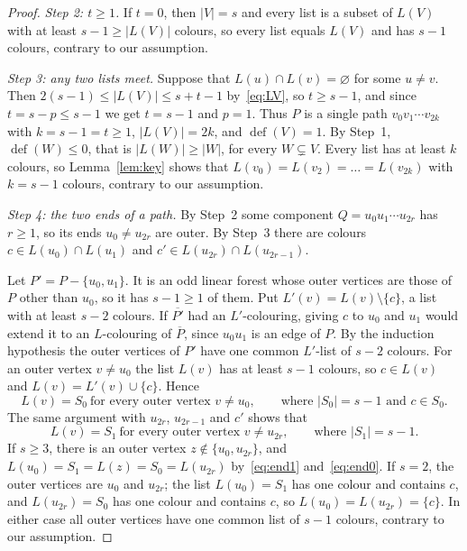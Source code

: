 \documentclass[11pt,a4paper,reqno]{amsart}
\theoremstyle{definition}
\theoremstyle{remark}
\newcommand{\df}{\operatorname{def}}
\begin{document}
\begin{proof}
\smallskip\noindent\emph{Step 2: $t\ge1$.} If $t=0$, then $|V|=s$ and every list is a subset of $L(V)$ with at least $s-1\ge|L(V)|$ colours, so every list equals $L(V)$ and has $s-1$ colours, contrary to our assumption.

\smallskip\noindent\emph{Step 3: any two lists meet.} Suppose that $L(u)\cap L(v)=\varnothing$ for some $u\ne v$. Then $2(s-1)\le|L(V)|\le s+t-1$ by~\eqref{eq:LV}, so $t\ge s-1$, and since $t=s-p\le s-1$ we get $t=s-1$ and $p=1$. Thus $P$ is a single path $v_0v_1\cdots v_{2k}$ with $k=s-1=t\ge1$, $|L(V)|=2k$, and $\df(V)=1$. By Step~1, $\df(W)\le0$, that is $|L(W)|\ge|W|$, for every $W\subsetneq V$. Every list has at least $k$ colours, so Lemma~\ref{lem:key} shows that $L(v_0)=L(v_2)=\dots=L(v_{2k})$ with $k=s-1$ colours, contrary to our assumption.

\smallskip\noindent\emph{Step 4: the two ends of a path.} By Step~2 some component $Q=u_0u_1\cdots u_{2r}$ has $r\ge1$, so its ends $u_0\ne u_{2r}$ are outer. By Step~3 there are colours $c\in L(u_0)\cap L(u_1)$ and $c'\in L(u_{2r})\cap L(u_{2r-1})$.

Let $P'=P-\{u_0,u_1\}$. It is an odd linear forest whose outer vertices are those of $P$ other than $u_0$, so it has $s-1\ge1$ of them. Put $L'(v)=L(v)\setminus\{c\}$, a list with at least $s-2$ colours. If $\overline{P'}$ had an $L'$-colouring, giving $c$ to $u_0$ and $u_1$ would extend it to an $L$-colouring of $\overline P$, since $u_0u_1$ is an edge of $P$. By the induction hypothesis the outer vertices of $P'$ have one common $L'$-list of $s-2$ colours. For an outer vertex $v\ne u_0$ the list $L(v)$ has at least $s-1$ colours, so $c\in L(v)$ and $L(v)=L'(v)\cup\{c\}$. Hence
\begin{equation}\label{eq:end0}
L(v)=S_0\ \text{for every outer vertex }v\ne u_0,\qquad\text{where }|S_0|=s-1\text{ and }c\in S_0.
\end{equation}
The same argument with $u_{2r}$, $u_{2r-1}$ and $c'$ shows that
\begin{equation}\label{eq:end1}
L(v)=S_1\ \text{for every outer vertex }v\ne u_{2r},\qquad\text{where }|S_1|=s-1.
\end{equation}
If $s\ge3$, there is an outer vertex $z\notin\{u_0,u_{2r}\}$, and $L(u_0)=S_1=L(z)=S_0=L(u_{2r})$ by~\eqref{eq:end1} and~\eqref{eq:end0}. If $s=2$, the outer vertices are $u_0$ and $u_{2r}$; the list $L(u_0)=S_1$ has one colour and contains $c$, and $L(u_{2r})=S_0$ has one colour and contains $c$, so $L(u_0)=L(u_{2r})=\{c\}$. In either case all outer vertices have one common list of $s-1$ colours, contrary to our assumption.
\end{proof}
\end{document}
